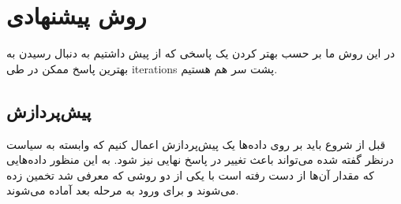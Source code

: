 	
	

\section{روش پیشنهادی}
در این روش ما بر حسب بهتر کردن یک پاسخی که از پیش داشتیم به دنبال رسیدن به بهترین پاسخ ممکن در طی \glspl{iteration} 
پشت سر هم هستیم. 

\subsection{پیش‌پردازش}
قبل از شروع باید بر روی داده‌ها یک پیش‌پردازش اعمال کنیم که وابسته به سیاست درنظر گفته شده می‌تواند باعث تغییر در پاسخ نهایی نیز شود. به این منظور داده‌هایی که مقدار آن‌ها از دست رفته است با یکی از دو روشی که معرفی شد تخمین زده می‌شوند و برای ورود به مرحله بعد آماده می‌شوند.

